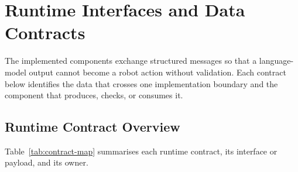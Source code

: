 \section{Runtime Interfaces and Data Contracts}
\label{sec:runtime-contracts}

The implemented components exchange structured messages so that a language-model output cannot become a robot action without validation. Each contract below identifies the data that crosses one implementation boundary and the component that produces, checks, or consumes it.

\subsection{Runtime Contract Overview}

Table~\ref{tab:contract-map} summarises each runtime contract, its interface or payload, and its owner.

